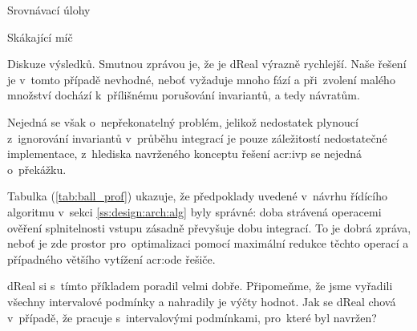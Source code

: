 \documentclass[thesis=M,czech]{FITthesis}[2012/06/26]
\newcommand{\acrlabel}[1]{acr:#1}
\newcommand{\acr}[1]{\acrshort{\acrlabel{#1}}}
\newcommand{\id}[1]{\texttt{#1}}
\newcommand{\rf}[1]{\ref{#1}}
\newcommand{\picFn}[1]{../img/#1}
\newcommand{\picL}{pic}
\newcommand{\rfPic}[1]{(\rf{\picL:#1})}
\newcommand{\pic}[5]{
\begin{figure}
{\centering
\texttt{[image: \\picFn\{\#1]}}
\caption{#4}
\label{\picL:#2}
}\smallskip
#5
\end{figure}
}
\newcommand{\tabL}{tab}
\newcommand{\rfTab}[1]{(\rf{\tabL:#1})}
\begin{document}
\begin{section}{Srovnávací úlohy}
\begin{subsection}{Skákající míč}
\begin{paragraph}{Diskuze výsledků.}
Smutnou zprávou je, že je dReal
výrazně rychlejší.
Naše řešení je v~tomto případě nevhodné,
neboť vyžaduje mnoho fází
a při~zvolení malého množství
dochází k~přílišnému porušování invariantů,
a tedy návratům.

Nejedná se však o~nepřekonatelný problém,
jelikož nedostatek plynoucí z~ignorování
invariantů v~průběhu integrací
je pouze záležitostí nedostatečné implementace,
z~hlediska navrženého konceptu řešení \acr{ivp}
se nejedná o~překážku.

Tabulka \rfTab{ball_prof} ukazuje,
že předpoklady uvedené v~návrhu
řídícího algoritmu v~sekci \rf{ss:design:arch:alg}
byly správné: doba strávená operacemi
ověření splnitelnosti vstupu
zásadně převyšuje dobu integrací.
To je dobrá zpráva,
neboť je zde prostor pro~optimalizaci
pomocí maximální redukce těchto operací
a případného většího vytížení \acr{ode} řešiče.
\end{paragraph} %


\bigskip

dReal si s~tímto příkladem poradil velmi dobře.
Připomeňme, že jsme vyřadili všechny intervalové podmínky
a nahradily je výčty hodnot.
Jak se dReal chová v~případě, že pracuje
s~intervalovými podmínkami,
pro~které byl navržen?


\end{subsection}
\end{section}
\end{document}
